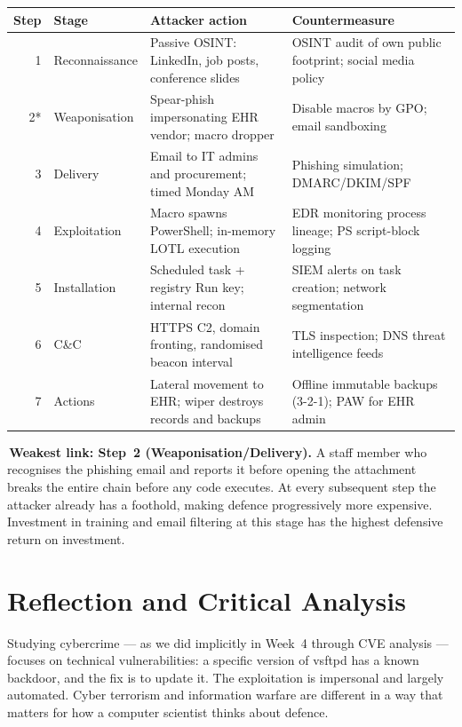 \documentclass[11pt,a4paper]{article}
\begin{document}
\small
\begin{tabularx}{\linewidth}{r >{\raggedright}p{2.4cm} >{\raggedright}p{3.8cm} >{\raggedright\arraybackslash}X}
\toprule
Step & Stage & Attacker action & Countermeasure \\
\midrule
1 & Reconnaissance  & Passive OSINT: LinkedIn, job posts, conference slides & OSINT audit of own public footprint; social media policy \\
2* & Weaponisation   & Spear-phish impersonating EHR vendor; macro dropper & Disable macros by GPO; email sandboxing \\
3 & Delivery        & Email to IT admins and procurement; timed Monday AM & Phishing simulation; DMARC/DKIM/SPF \\
4 & Exploitation    & Macro spawns PowerShell; in-memory LOTL execution & EDR monitoring process lineage; PS script-block logging \\
5 & Installation    & Scheduled task + registry Run key; internal recon & SIEM alerts on task creation; network segmentation \\
6 & C\&C            & HTTPS C2, domain fronting, randomised beacon interval & TLS inspection; DNS threat intelligence feeds \\
7 & Actions         & Lateral movement to EHR; wiper destroys records and backups & Offline immutable backups (3-2-1); PAW for EHR admin \\
\bottomrule
\end{tabularx}
\normalsize

\vspace{4pt}
\noindent*\,\textbf{Weakest link: Step~2 (Weaponisation/Delivery).} A staff member
who recognises the phishing email and reports it before opening the attachment
breaks the entire chain before any code executes. At every subsequent step the
attacker already has a foothold, making defence progressively more expensive.
Investment in training and email filtering at this stage has the highest
defensive return on investment.


\section{Reflection and Critical Analysis}

Studying cybercrime --- as we did implicitly in Week~4 through CVE analysis ---
focuses on technical vulnerabilities: a specific version of vsftpd has a known
backdoor, and the fix is to update it. The exploitation is impersonal and largely
automated. Cyber terrorism and information warfare are different in a way that
matters for how a computer scientist thinks about defence.
\end{document}
